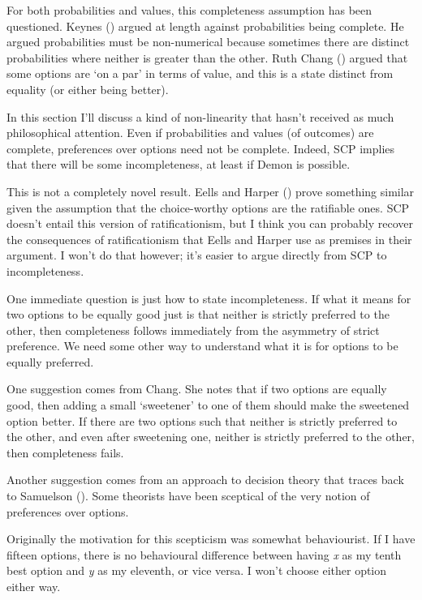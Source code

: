 \documentclass[
  10pt,
  letterpaper,
  DIV=11,
  numbers=noendperiod,
  twoside]{scrartcl}
\begin{document}
For both probabilities and values, this completeness assumption has been
questioned. Keynes () argued at length
against probabilities being complete. He argued probabilities must be
non-numerical because sometimes there are distinct probabilities where
neither is greater than the other. Ruth Chang
() argued that some options are `on a par'
in terms of value, and this is a state distinct from equality (or either
being better).

In this section I'll discuss a kind of non-linearity that hasn't
received as much philosophical attention. Even if probabilities and
values (of outcomes) are complete, preferences over options need not be
complete. Indeed, SCP implies that there will be some incompleteness, at
least if Demon is possible.

This is not a completely novel result. Eells and Harper
() prove something similar given the
assumption that the choice-worthy options are the ratifiable ones. SCP
doesn't entail this version of ratificationism, but I think you can
probably recover the consequences of ratificationism that Eells and
Harper use as premises in their argument. I won't do that however; it's
easier to argue directly from SCP to incompleteness.

One immediate question is just how to state incompleteness. If what it
means for two options to be equally good just is that neither is
strictly preferred to the other, then completeness follows immediately
from the asymmetry of strict preference. We need some other way to
understand what it is for options to be equally preferred.

One suggestion comes from Chang. She notes that if two options are
equally good, then adding a small `sweetener' to one of them should make
the sweetened option better. If there are two options such that neither
is strictly preferred to the other, and even after sweetening one,
neither is strictly preferred to the other, then completeness fails.

Another suggestion comes from an approach to decision theory that traces
back to Samuelson (). Some theorists
have been sceptical of the very notion of preferences over options.

Originally the motivation for this scepticism was somewhat behaviourist.
If I have fifteen options, there is no behavioural difference between
having \emph{x} as my tenth best option and \emph{y} as my eleventh, or
vice versa. I won't choose either option either way.
\end{document}
